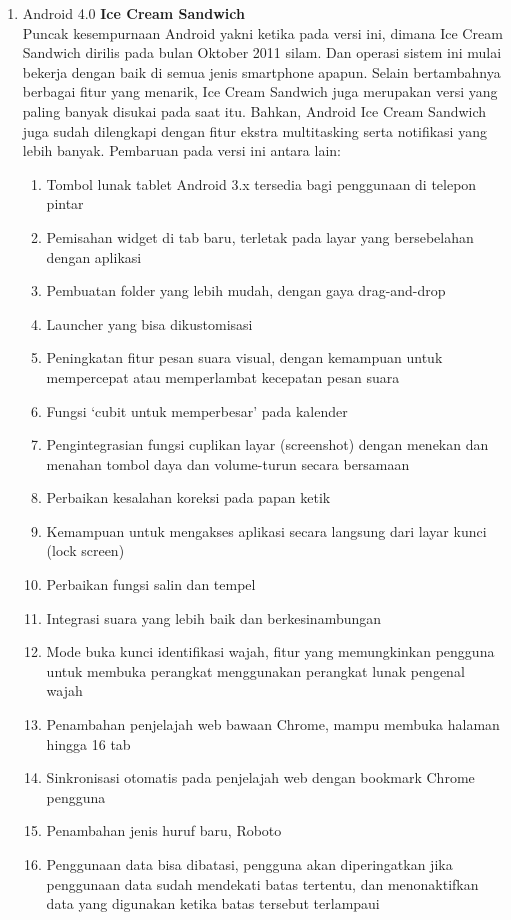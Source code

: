 \begin{enumerate}
\item Android 4.0 \textbf{Ice Cream Sandwich}\\
Puncak kesempurnaan Android yakni ketika pada versi ini, dimana Ice Cream Sandwich dirilis pada bulan Oktober 2011 silam. Dan operasi sistem ini mulai bekerja dengan baik di semua jenis smartphone apapun. Selain bertambahnya berbagai fitur yang menarik, Ice Cream Sandwich juga merupakan versi yang paling banyak disukai pada saat itu. Bahkan, Android Ice Cream Sandwich juga sudah dilengkapi dengan fitur ekstra multitasking serta notifikasi yang lebih banyak. Pembaruan pada versi ini antara lain:
\begin{enumerate}
    \item Tombol lunak tablet Android 3.x tersedia bagi penggunaan di telepon pintar
    \item Pemisahan widget di tab baru, terletak pada layar yang bersebelahan dengan aplikasi
    \item Pembuatan folder yang lebih mudah, dengan gaya drag-and-drop
    \item Launcher yang bisa dikustomisasi
    \item Peningkatan fitur pesan suara visual, dengan kemampuan untuk mempercepat atau memperlambat kecepatan pesan suara
    \item Fungsi ‘cubit untuk memperbesar’ pada kalender
    \item Pengintegrasian fungsi cuplikan layar (screenshot) dengan menekan dan menahan tombol daya dan volume-turun secara bersamaan
    \item Perbaikan kesalahan koreksi pada papan ketik
    \item Kemampuan untuk mengakses aplikasi secara langsung dari layar kunci (lock screen)
    \item Perbaikan fungsi salin dan tempel
    \item Integrasi suara yang lebih baik dan berkesinambungan
    \item Mode buka kunci identifikasi wajah, fitur yang memungkinkan pengguna untuk membuka perangkat menggunakan perangkat lunak pengenal wajah
    \item Penambahan penjelajah web bawaan Chrome, mampu membuka halaman hingga 16 tab
    \item Sinkronisasi otomatis pada penjelajah web dengan bookmark Chrome pengguna
    \item Penambahan jenis huruf baru, Roboto
    \item Penggunaan data bisa dibatasi, pengguna akan diperingatkan jika penggunaan data sudah mendekati batas tertentu, dan menonaktifkan data yang digunakan ketika batas tersebut terlampaui

\end{enumerate}
\end{enumerate}
